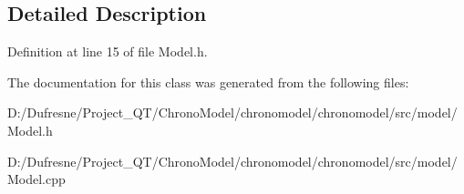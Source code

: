\subsection{Detailed Description}


Definition at line 15 of file Model.\-h.



The documentation for this class was generated from the following files\-:\begin{DoxyCompactItemize}
\item 
D\-:/\-Dufresne/\-Project\-\_\-\-Q\-T/\-Chrono\-Model/chronomodel/chronomodel/src/model/Model.\-h\item 
D\-:/\-Dufresne/\-Project\-\_\-\-Q\-T/\-Chrono\-Model/chronomodel/chronomodel/src/model/Model.\-cpp\end{DoxyCompactItemize}
